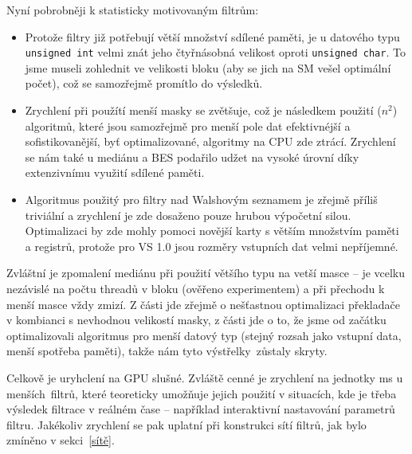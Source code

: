     \newpage
    Nyní pobrobněji k statisticky motivovaným filtrům:
    \begin{itemize}
      \item Protože filtry již potřebují větší množství sdílené paměti, je u datového typu {\tt unsigned int} velmi znát jeho čtyřnásobná velikost oproti {\tt unsigned char}. To jsme museli zohlednit ve velikosti bloku (aby se jich na SM vešel optimální počet), což se samozřejmě promítlo do výsledků.
      \item Zrychlení při použítí menší masky se zvětšuje, což je následkem použití \OOO($n^2$) algoritmů, které jsou samozřejmě pro menší pole dat efektivnéjší a sofistikovanější, byť optimalizované, algoritmy na CPU zde ztrácí. Zrychlení se nám také u mediánu a BES podařilo udžet na vysoké úrovní díky extenzivnímu využití sdílené paměti.
      \item Algoritmus použitý pro filtry nad Walshovým seznamem je zřejmě příliš triviální a zrychlení je zde dosaženo pouze hrubou výpočetní silou. Optimalizaci by zde mohly pomoci novější karty s větším množstvím paměti a registrů, protože pro VS 1.0 jsou rozměry vstupních dat velmi nepříjemné.
    \end{itemize}

    Zvláštní je zpomalení mediánu při použití většího typu na vetší masce -- je vcelku nezávislé na počtu threadů v bloku (ověřeno experimentem) a při přechodu k menší masce vždy zmizí. Z části jde zřejmě o nešťastnou optimalizaci překladače v kombianci s nevhodnou velikostí masky, z části jde o to, že jsme od začátku optimalizovali algoritmus pro menší datový typ (stejný rozsah jako vstupní data, menší spotřeba paměti), takže nám tyto \bq výstřelky\eq ~zůstaly skryty.

    \vspace{0.5cm}

    Celkově je uryhclení na GPU slušné. Zvláště cenné je zrychlení na jednotky ms u \bq menších\eq ~filtrů, které teoreticky umožňuje jejich použití v situacích, kde je třeba výsledek filtrace v reálném čase -- například interaktivní nastavování parametrů filtru. Jakékoliv zrychlení se pak uplatní při konstrukci sítí filtrů, jak bylo zmíněno v sekci~\ref{sítě}.















